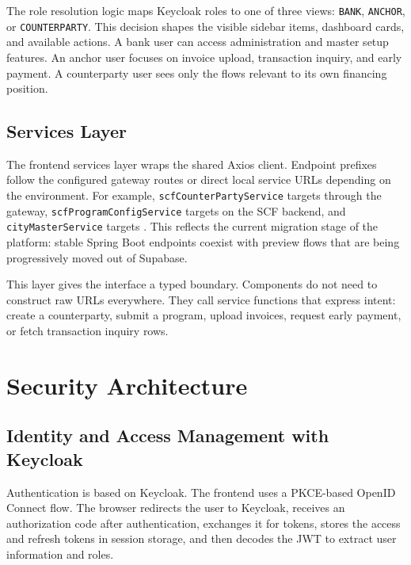 The role resolution logic maps Keycloak roles to one of three views: \texttt{BANK}, \texttt{ANCHOR}, or \texttt{COUNTERPARTY}. This decision shapes the visible sidebar items, dashboard cards, and available actions. A bank user can access administration and master setup features. An anchor user focuses on invoice upload, transaction inquiry, and early payment. A counterparty user sees only the flows relevant to its own financing position.

\subsection{Services Layer}
\label{subsec:frontend_services_layer}

The frontend services layer wraps the shared Axios client. Endpoint prefixes follow the configured gateway routes or direct local service URLs depending on the environment. For example, \texttt{scfCounterPartyService} targets  through the gateway, \texttt{scfProgramConfigService} targets  on the SCF backend, and \texttt{cityMasterService} targets . This reflects the current migration stage of the platform: stable Spring Boot endpoints coexist with preview flows that are being progressively moved out of Supabase.

This layer gives the interface a typed boundary. Components do not need to construct raw URLs everywhere. They call service functions that express intent: create a counterparty, submit a program, upload invoices, request early payment, or fetch transaction inquiry rows.

\section{Security Architecture}
\label{sec:security_architecture}

\subsection{Identity and Access Management with Keycloak}
\label{subsec:keycloak_iam}

Authentication is based on Keycloak. The frontend uses a PKCE-based OpenID Connect flow. The browser redirects the user to Keycloak, receives an authorization code after authentication, exchanges it for tokens, stores the access and refresh tokens in session storage, and then decodes the JWT to extract user information and roles.

